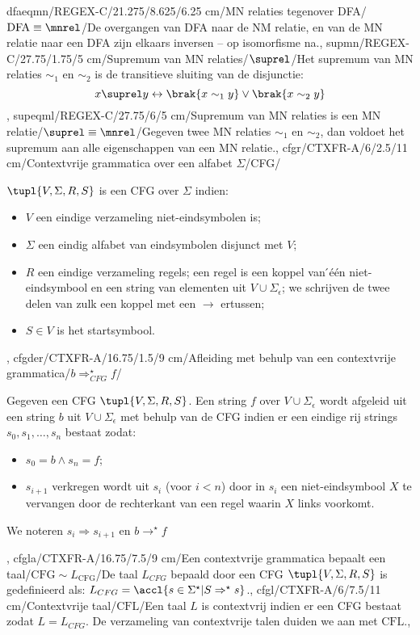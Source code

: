 dfaeqmn/REGEX-C/21.275/8.625/6.25 cm/MN relaties tegenover DFA/$\mbox{DFA}\equiv\mnrel$/{De overgangen van DFA naar de NM relatie, en van de MN relatie naar een DFA zijn elkaars inversen -- op isomorfisme na.},
supmn/REGEX-C/27.75/1.75/5 cm/Supremum van MN relaties/$\suprel$/{Het supremum van MN relaties $\sim_1$ en $\sim_2$ is de transitieve sluiting van de disjunctie:\[x\suprel y\leftrightarrow\brak{x\sim_1 y}\vee\brak{x\sim_2 y}\]},
supeqml/REGEX-C/27.75/6/5 cm/Supremum van MN relaties is een MN relatie/$\suprel\equiv\mnrel$/{Gegeven twee MN relaties $\sim_1$ en $\sim_2$, dan voldoet het supremum aan alle eigenschappen van een MN relatie.},
cfgr/CTXFR-A/6/2.5/11 cm/Contextvrije grammatica over een alfabet $\Sigma$/CFG/{$\tupl{V,\Sigma,R,S}$ is een CFG over $\Sigma$ indien:\begin{itemize}\item $V$ een eindige verzameling niet-eindsymbolen is; \item $\Sigma$ een eindig alfabet van eindsymbolen disjunct met $V$; \item $R$ een eindige verzameling regels; een regel is een koppel van  ́\'e\'en niet-eindsymbool en een string van elementen uit $V\cup\Sigma_{\epsilon}$; we schrijven de twee delen van zulk een koppel met een $\rightarrow$ ertussen;\item $S\in V$ is het startsymbool.\end{itemize}},
cfgder/CTXFR-A/16.75/1.5/9 cm/Afleiding met behulp van een contextvrije grammatica/$b\Rightarrow_{CFG}^{\star}f$/{Gegeven een CFG $\tupl{V,\Sigma,R,S}$. Een string $f$ over $V\cup\Sigma_{\epsilon}$ wordt afgeleid uit een string $b$ uit $V\cup\Sigma_{\epsilon}$ met behulp van de CFG indien er een eindige rij strings $s_0,s_1,\ldots,s_n$ bestaat zodat:\begin{itemize}\item $s_0=b\wedge s_n=f$; \item $s_{i+1}$ verkregen wordt uit $s_i$ (voor $i<n$) door in $s_i$ een niet-eindsymbool $X$ te vervangen door de rechterkant van een regel waarin $X$ links voorkomt.\end{itemize}We noteren $s_i\Rightarrow s_{i+1}$ en $b\rightarrow^{\star}f$},
cfgla/CTXFR-A/16.75/7.5/9 cm/Een contextvrije grammatica bepaalt een taal/$\mbox{CFG}\sim L_{\mbox{CFG}}$/{De taal $L_{CFG}$ bepaald door een CFG $\tupl{V,\Sigma,R,S}$ is gedefinieerd als: $L_{CFG}=\accl{s\in\Sigma^{\star}|S\Rightarrow^{\star}s}$.},
cfgl/CTXFR-A/6/7.5/11 cm/Contextvrije taal/$\mbox{CFL}$/{Een taal $L$ is contextvrij indien er een CFG bestaat zodat $L=L_{CFG}$. De verzameling van contextvrije talen duiden we aan met $\mbox{CFL}$.},
